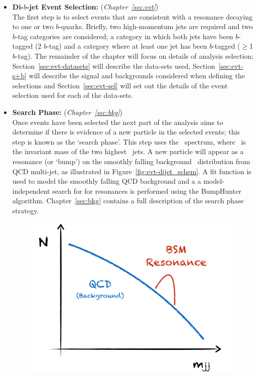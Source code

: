 \begin{itemize}[leftmargin=*]
\item\textbf{Di-$b$-jet Event Selection:} (\textit{Chapter~\ref{sec:evt}})\\
  The first step is to select events that are consistent with a resonance decaying to one or two $b$-quarks.
  Briefly, two high-momentum jets are required and two $b$-tag categories are considered;
  a category in which both jets have been $b$-tagged (2 $b$-tag) and a category where at least one jet has been $b$-tagged ($\geq$1 $b$-tag).
  The remainder of the chapter will focus on details of analysis selection;
  Section~\ref{sec:evt-datasets} will describe the data-sets used,
  Section~\ref{sec:evt-s+b} will describe the signal and backgrounds
  considered when defining the selections
  and Section~\ref{sec:evt-sel} will set out
  the details of the event selection used for each of the data-sets.
  \\
\item\textbf{Search Phase:} (\textit{Chapter~\ref{sec:bkg}})\\
  Once events have been selected the next part of the analysis aims to determine if there
  is evidence of a new particle in the selected events; this step is known as the `search phase'.
  This step uses the \mjj~spectrum, where \mjj~is the invariant mass of the two highest \pT~jets.
  A new particle will appear as a resonance (or `bump') on the smoothly falling background
  \mjj~distribution from QCD multi-jet, as illustrated in Figure~\ref{fig:evt-dijet_schem}.
  A fit function is used to model the smoothly falling QCD background and a
  a model-independent search for for resonances is performed using the BumpHunter algorithm.
  Chapter~\ref{sec:bkg} contains a full description of the search phase strategy.
  \vspace{-2mm}
  \begin{figure}[!hbt]
  \begin{center}
    \includegraphics[width=0.65\linewidth, angle=0]{figs/Dibjet/Gen/dijet_schem.pdf}

\end{center}
\end{figure}
\end{itemize}
